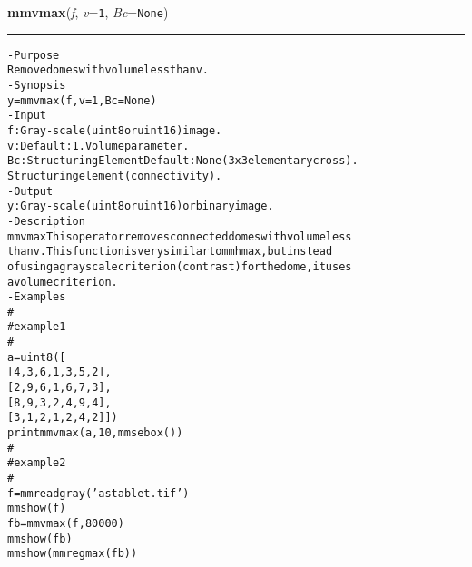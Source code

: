     \label{multireg:num_pymorph:mmvmax}
    \vspace{0.5ex}

    \begin{boxedminipage}{\textwidth}

    \raggedright \textbf{mmvmax}(\textit{f}, \textit{v}=\texttt{1\-}, \textit{Bc}=\texttt{N\-o\-n\-e\-})

    \vspace{-1.5ex}

    \rule{\textwidth}{0.5\fboxrule}
\begin{alltt}
- Purpose
    Remove domes with volume less than v.
- Synopsis
    y = mmvmax(f, v=1, Bc=None)
- Input
    f:  Gray-scale (uint8 or uint16) image.
    v:  Default: 1. Volume parameter.
    Bc: Structuring Element Default: None (3x3 elementary cross).
        Structuring element (connectivity).
- Output
    y: Gray-scale (uint8 or uint16) or binary image.
- Description
    mmvmax This operator removes connected domes with volume less
    than v . This function is very similar to mmhmax , but instead
    of using a gray scale criterion (contrast) for the dome, it uses
    a volume criterion.
- Examples
    \#
    \#   example 1
    \#
    a = uint8([
        [4,  3,  6,  1,  3,  5,  2],
        [2,  9,  6,  1,  6,  7,  3],
        [8,  9,  3,  2,  4,  9,  4],
        [3,  1,  2,  1,  2,  4,  2]])
    print mmvmax(a,10,mmsebox())
    \#
    \#   example 2
    \#
    f = mmreadgray('astablet.tif')
    mmshow(f)
    fb = mmvmax(f,80000)
    mmshow(fb)
    mmshow(mmregmax(fb))\end{alltt}

    \vspace{1ex}

    \end{boxedminipage}

    \label{multireg:num_pymorph:mmwatershed}
    \vspace{0.5ex}

